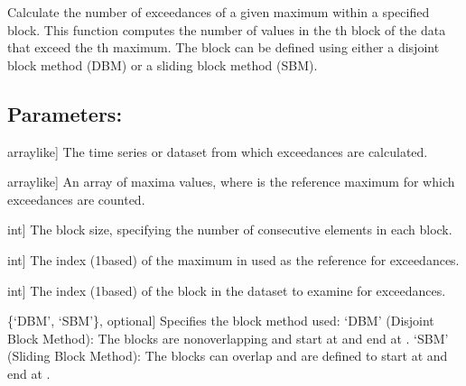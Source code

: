 \documentclass[a4paper,11pt,openany,english]{sphinxmanual}
\begin{document}
\begin{fulllineitems}
\label{\detokenize{api_biascorrection:xtremes.biascorrection.exceedances}}
\pysigstartsignatures
{}
\pysigstopsignatures
\sphinxAtStartPar
Calculate the number of exceedances of a given maximum within a specified block.
This function computes the number of values in the \sphinxhyphen{}th block of the data that 
exceed the \sphinxhyphen{}th maximum. The block can be defined using either a disjoint block 
method (DBM) or a sliding block method (SBM).


\subsection{Parameters:}
\label{\detokenize{api_biascorrection:id4}}\begin{description}
\sphinxlineitem{data}{[}array\sphinxhyphen{}like{]}
\sphinxAtStartPar
The time series or dataset from which exceedances are calculated.

\sphinxlineitem{maxima}{[}array\sphinxhyphen{}like{]}
\sphinxAtStartPar
An array of maxima values, where  is the reference maximum 
for which exceedances are counted.

\sphinxlineitem{bs}{[}int{]}
\sphinxAtStartPar
The block size, specifying the number of consecutive elements in each block.

\sphinxlineitem{i}{[}int{]}
\sphinxAtStartPar
The index (1\sphinxhyphen{}based) of the maximum in  used as the reference for exceedances.

\sphinxlineitem{j}{[}int{]}
\sphinxAtStartPar
The index (1\sphinxhyphen{}based) of the block in the dataset to examine for exceedances.

\sphinxlineitem{stride}{[}\{‘DBM’, ‘SBM’\}, optional{]}
\sphinxAtStartPar
Specifies the block method used:
\sphinxhyphen{} ‘DBM’ (Disjoint Block Method): The blocks are non\sphinxhyphen{}overlapping and start at  and end at .
\sphinxhyphen{} ‘SBM’ (Sliding Block Method): The blocks can overlap and are defined to start at  and end at .


\end{description}
\end{fulllineitems}
\end{document}

